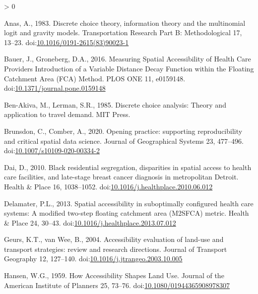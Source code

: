 \documentclass[]{elsarticle} %
\newlength{\cslhangindent}
\newenvironment{CSLReferences}[2] %
 {%
  \setlength{\parindent}{0pt}
  \ifodd #1 \everypar{\setlength{\hangindent}{\cslhangindent}}\ignorespaces\fi
  \ifnum #2 > 0
  \setlength{\parskip}{#2\baselineskip}
  \fi
 }%
 {}
\begin{document}
\hypertarget{refs}{}
\begin{CSLReferences}{1}{0}
\leavevmode\hypertarget{ref-anas1983}{}%
Anas, A., 1983. Discrete choice theory, information theory and the
multinomial logit and gravity models. Transportation Research Part B:
Methodological 17, 13--23.
doi:\href{https://doi.org/10.1016/0191-2615(83)90023-1}{10.1016/0191-2615(83)90023-1}

\leavevmode\hypertarget{ref-bauer2016}{}%
Bauer, J., Groneberg, D.A., 2016. Measuring Spatial Accessibility of
Health Care Providers {{}} Introduction of a Variable Distance Decay
Function within the Floating Catchment Area (FCA) Method. PLOS ONE 11,
e0159148.
doi:\href{https://doi.org/10.1371/journal.pone.0159148}{10.1371/journal.pone.0159148}

\leavevmode\hypertarget{ref-ben1985}{}%
Ben-Akiva, M., Lerman, S.R., 1985. Discrete choice analysis: Theory and
application to travel demand. MIT Press.

\leavevmode\hypertarget{ref-brunsdon2020}{}%
Brunsdon, C., Comber, A., 2020. Opening practice: supporting
reproducibility and critical spatial data science. Journal of
Geographical Systems 23, 477--496.
doi:\href{https://doi.org/10.1007/s10109-020-00334-2}{10.1007/s10109-020-00334-2}

\leavevmode\hypertarget{ref-dai2010}{}%
Dai, D., 2010. Black residential segregation, disparities in spatial
access to health care facilities, and late-stage breast cancer diagnosis
in metropolitan Detroit. Health \& Place 16, 1038--1052.
doi:\href{https://doi.org/10.1016/j.healthplace.2010.06.012}{10.1016/j.healthplace.2010.06.012}

\leavevmode\hypertarget{ref-delamater2013}{}%
Delamater, P.L., 2013. Spatial accessibility in suboptimally configured
health care systems: A modified two-step floating catchment area
(M2SFCA) metric. Health \& Place 24, 30--43.
doi:\href{https://doi.org/10.1016/j.healthplace.2013.07.012}{10.1016/j.healthplace.2013.07.012}

\leavevmode\hypertarget{ref-geurs2004}{}%
Geurs, K.T., van Wee, B., 2004. Accessibility evaluation of land-use and
transport strategies: review and research directions. Journal of
Transport Geography 12, 127--140.
doi:\href{https://doi.org/10.1016/j.jtrangeo.2003.10.005}{10.1016/j.jtrangeo.2003.10.005}

\leavevmode\hypertarget{ref-hansen1959}{}%
Hansen, W.G., 1959. How Accessibility Shapes Land Use. Journal of the
American Institute of Planners 25, 73--76.
doi:\href{https://doi.org/10.1080/01944365908978307}{10.1080/01944365908978307}


\end{CSLReferences}
\end{document}
